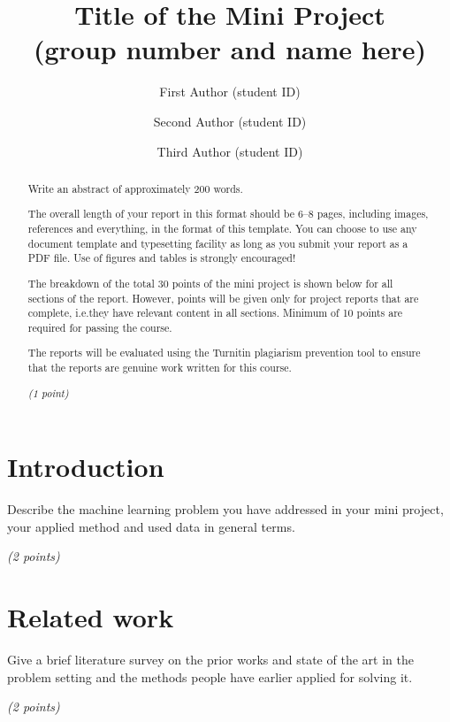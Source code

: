 \documentclass[a4paper,11pt]{article}
\begin{document}
\title{Title of the Mini Project\\
\normalsize (group number and name here)}

\author{First Author (student ID) \and Second Author (student ID)
  \and Third Author (student ID)}

\maketitle

\newcommand{\points}[1]{\par\noindent\textit{(#1 points)}}
\newcommand{\onepoint}{\par\noindent\textit{(1 point)}}

\begin{abstract}
  Write an abstract of approximately 200 words.

  The overall length of your report in this format should be 6--8
  pages, including images, references and everything, in the format of
  this template.  You can choose to use any document template and
  typesetting facility as long as you submit your report as a PDF file.
  Use of figures and tables is strongly encouraged!

  The breakdown of the total 30 points of the mini project is shown
  below for all sections of the report. However, points will be given
  only for project reports that are complete, i.e.\@ they have
  relevant content in all sections.  Minimum of 10 points are required
  for passing the course.  
  
  The reports will be evaluated using the Turnitin plagiarism
  prevention tool to ensure that the reports are genuine work written
  for this course.
  \onepoint
\end{abstract}

\section{Introduction}

Describe the machine learning problem you have addressed in your mini
project, your applied method and used data in general terms.
\points{2}

\section{Related work}

Give a brief literature survey on the prior works and state of the art
in the problem setting and the methods people have earlier applied for
solving it.
\points{2}
\end{document}
